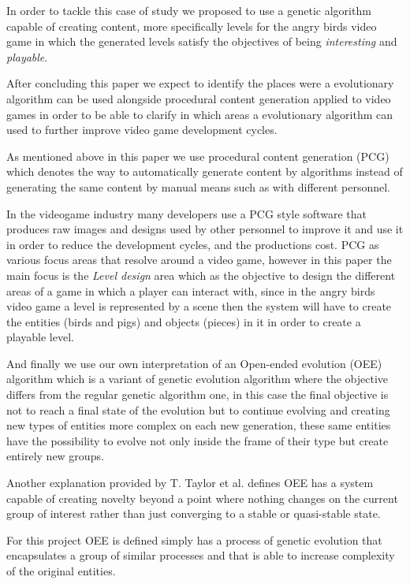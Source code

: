 \documentclass[conference]{IEEEtran}
\begin{document}
In order to tackle this case of study we proposed to use a genetic algorithm capable 
of creating content, more specifically levels for the angry birds video game in which
the generated levels satisfy the objectives of being \textit{interesting} and 
\textit{playable}.

After concluding this paper we expect to identify the places were a evolutionary 
algorithm can be used alongside procedural content generation applied to video games
in order to be able to clarify in which areas a evolutionary algorithm can used 
to further improve video game development cycles.

As mentioned above in this paper we use procedural content generation (PCG) 
which denotes the way to automatically generate
content by algorithms instead of generating the same content by manual means
such as with different personnel.

In the videogame industry many developers use a PCG style software that produces
raw images and designs used by other personnel to improve it and use it in order
to reduce the development cycles, and the productions cost. 
PCG as various focus areas that resolve around a video game, however in this paper 
the main focus is the \textit{Level design} area which as the objective to design 
the different areas of a game in which a player can interact with, since in the 
angry birds video game a level is represented by a scene then the system will 
have to create the entities (birds and pigs) and objects (pieces) in it in order 
to create a playable level.

And finally we use our own interpretation of an Open-ended evolution (OEE) 
algorithm which is a variant of genetic evolution algorithm where
the objective differs from the regular genetic algorithm one, in this case the
final objective is not to reach a final state of the evolution but to continue
evolving and creating new types of entities more complex on each new generation,
these same entities have the possibility to evolve not only inside the frame of
their type but create entirely new groups. \cite{Standish2003}

Another explanation provided by T. Taylor et al. \cite{Taylor2016,Taylor}
defines OEE has a system capable of creating novelty beyond a point where
nothing changes on the current group of interest rather than just converging to
a stable or quasi-stable state.

For this project OEE is defined simply has a process of genetic evolution that
encapsulates a group of similar processes and that is able to increase complexity
 of the original entities.
\end{document}
